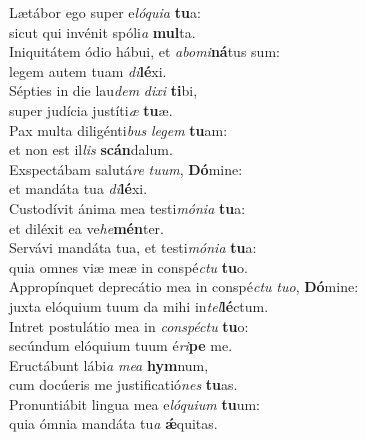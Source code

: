 \evenverse Lætábor ego super e\textit{ló}\textit{qui}\textit{a} \textbf{tu}a:~\*\\
\evenverse sicut qui invénit spóli\textit{a} \textbf{mul}ta.\\
\oddverse Iniquitátem ódio hábui, et \textit{a}\textit{bo}\textit{mi}\textbf{ná}tus sum:~\*\\
\oddverse legem autem tuam \textit{di}\textbf{lé}xi.\\
\evenverse Sépties in die lau\textit{dem} \textit{di}\textit{xi} \textbf{ti}bi,~\*\\
\evenverse super judícia justíti\textit{æ} \textbf{tu}æ.\\
\oddverse Pax multa diligénti\textit{bus} \textit{le}\textit{gem} \textbf{tu}am:~\*\\
\oddverse et non est il\textit{lis} \textbf{scán}dalum.\\
\evenverse Exspectábam salutá\textit{re} \textit{tu}\textit{um}, \textbf{Dó}mine:~\*\\
\evenverse et mandáta tua \textit{di}\textbf{lé}xi.\\
\oddverse Custodívit ánima mea testi\textit{mó}\textit{ni}\textit{a} \textbf{tu}a:~\*\\
\oddverse et diléxit ea ve\textit{he}\textbf{mén}ter.\\
\evenverse Servávi mandáta tua, et testi\textit{mó}\textit{ni}\textit{a} \textbf{tu}a:~\*\\
\evenverse quia omnes viæ meæ in conspé\textit{ctu} \textbf{tu}o.\\
\oddverse Appropínquet deprecátio mea in conspé\textit{ctu} \textit{tu}\textit{o}, \textbf{Dó}mine:~\*\\
\oddverse juxta elóquium tuum da mihi in\textit{tel}\textbf{lé}ctum.\\
\evenverse Intret postulátio mea in \textit{con}\textit{spé}\textit{ctu} \textbf{tu}o:~\*\\
\evenverse secúndum elóquium tuum é\textit{ri}\textbf{pe} me.\\
\oddverse Eructábunt lábi\textit{a} \textit{me}\textit{a} \textbf{hym}num,~\*\\
\oddverse cum docúeris me justificatió\textit{nes} \textbf{tu}as.\\
\evenverse Pronuntiábit lingua mea e\textit{ló}\textit{qui}\textit{um} \textbf{tu}um:~\*\\
\evenverse quia ómnia mandáta tu\textit{a} \textbf{ǽ}quitas.\\
